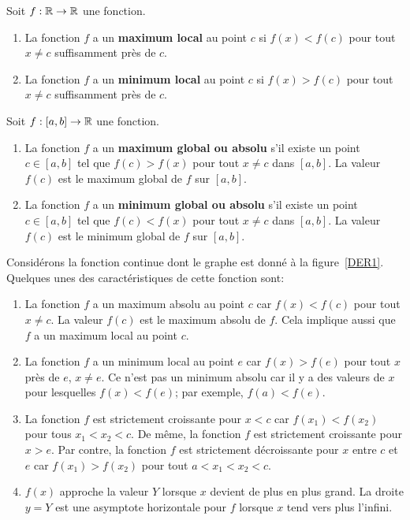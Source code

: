 {\begin{focus}{\dfn}
Soit $f:\mathbb{R} \rightarrow \mathbb{R}$ une fonction.
\begin{enumerate}
\item La fonction $f$ a un {\bfseries maximum local}
 au point $c$ si $f(x) < f(c)$ pour tout
$x \neq c$ suffisamment près de $c$.
\item La fonction $f$ a un {\bfseries minimum local}
 au point $c$ si $f(x) > f(c)$ pour tout
$x \neq c$ suffisamment près de $c$.
\end{enumerate}
\end{focus}

\begin{focus}{\dfn}
Soit $f:[a,b] \rightarrow \mathbb{R}$ une fonction.
\begin{enumerate}
\item La fonction $f$ a un {\bfseries maximum global ou absolu}
 
s'il existe un point $c \in [a,b]$ tel que $f(c) > f(x)$
pour tout $x\neq c$ dans $[a,b]$.  La valeur $f(c)$ est le maximum
global de $f$ sur $[a,b]$.
\item La fonction $f$ a un {\bfseries minimum global ou absolu}
 
s'il existe un point $c \in [a,b]$ tel que $f(c) < f(x)$
pour tout $x\neq c$ dans $[a,b]$.  La valeur $f(c)$ est le minimum
global de $f$ sur $[a,b]$.
\end{enumerate}
\label{maxminabs}
\end{focus}

\begin{egg}
Considérons la fonction continue dont le graphe est donné à la
figure~\ref{DER1}.  Quelques unes des caractéristiques de cette
fonction sont:
\begin{enumerate}
\item La fonction $f$ a un maximum absolu au point $c$ car $f(x)<f(c)$
pour tout $x\neq c$.  La valeur $f(c)$ est le maximum absolu de $f$.
Cela implique aussi que $f$ a un maximum local au point $c$.
\item La fonction $f$ a un minimum local au point $e$ car $f(x)>f(e)$
pour tout $x$ près de $e$, $x\neq e$.  Ce n'est pas un minimum absolu
car il y a des valeurs de $x$ pour lesquelles $f(x) < f(e)$; par
exemple, $f(a) < f(e)$.
\item La fonction $f$ est strictement croissante pour $x<c$ car
$f(x_1) < f(x_2)$ pour tous $x_1 < x_2 < c$.  De même, la fonction $f$
est strictement croissante pour $x>e$.  Par contre, la fonction $f$
est strictement décroissante pour $x$ entre $c$ et $e$ car
$f(x_1) > f(x_2)$ pour tout $a < x_1 < x_2 < c$.
\item $f(x)$ approche la valeur $Y$ lorsque $x$ devient de
plus en plus grand.  La droite $y=Y$ est une asymptote horizontale
pour $f$ lorsque $x$ tend vers plus l'infini.
\end{enumerate}
\label{caractF}
\end{egg}

}
